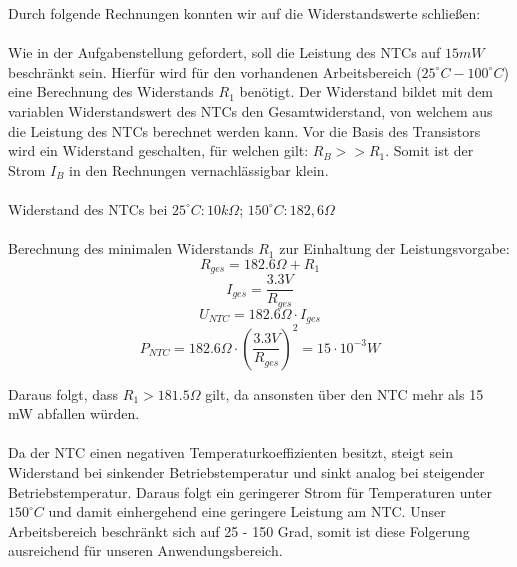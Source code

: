 \newpage
\noindent
Durch folgende Rechnungen konnten wir auf die Widerstandswerte schließen: \\
\\
Wie in der Aufgabenstellung gefordert, soll die Leistung des NTCs auf $15 mW$ beschränkt sein. Hierfür wird für den vorhandenen Arbeitsbereich ($25^{\circ} C - 100^{\circ} C$) eine Berechnung des Widerstands $R_1$ benötigt. Der Widerstand bildet mit dem variablen Widerstandswert des NTCs den Gesamtwiderstand, von welchem aus die Leistung des NTCs berechnet werden kann. Vor die Basis des Transistors wird ein Widerstand geschalten, für welchen gilt: $R_B >> R_1$. Somit ist der Strom $I_B$ in den Rechnungen vernachlässigbar klein.\\
\\
Widerstand des NTCs bei $25^{\circ} C: 10 k\Omega$; $150^{\circ} C: 182,6 \Omega$ \cite{ntc} \\
\\
Berechnung des minimalen Widerstands $R_1$ zur Einhaltung der Leistungsvorgabe:
\[ R_{ges} = 182.6 \Omega + R_1 \]
\[ I_{ges} = \frac{3.3 V}{R_{ges}} \]
\[ U_{NTC} = 182.6 \Omega \cdot I_{ges} \]
\[ P_{NTC} = 182.6 \Omega \cdot \left(\frac{3.3 V}{R_{ges}}\right)^2 = 15\cdot10^{-3} W \]


\noindent
Daraus folgt, dass $R_1 > 181.5 \Omega$ gilt, da ansonsten über den NTC mehr als 15 mW abfallen würden. \\
\\
Da der NTC einen negativen Temperaturkoeffizienten besitzt, steigt sein Widerstand bei sinkender Betriebstemperatur und sinkt analog bei steigender Betriebstemperatur. Daraus folgt ein geringerer Strom für Temperaturen unter $150^{\circ} C$ und damit einhergehend eine geringere Leistung am NTC. Unser Arbeitsbereich beschränkt sich auf 25 - 150 Grad, somit ist diese Folgerung ausreichend für unseren Anwendungsbereich. \\

